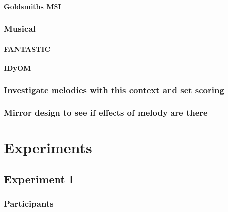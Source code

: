 \documentclass[]{book}
\let\oldparagraph\paragraph
\renewcommand{\paragraph}[1]{\oldparagraph{#1}\mbox{}}
\theoremstyle{definition}
\theoremstyle{definition}
\theoremstyle{definition}
\theoremstyle{remark}
\begin{document}
\hypertarget{goldsmiths-msi}{%
\paragraph{Goldsmiths MSI}\label{goldsmiths-msi}}

\hypertarget{musical}{%
\subsubsection{Musical}\label{musical}}

\hypertarget{fantastic-1}{%
\paragraph{FANTASTIC}\label{fantastic-1}}

\hypertarget{idyom}{%
\paragraph{IDyOM}\label{idyom}}

\hypertarget{investigate-melodies-with-this-context-and-set-scoring}{%
\subsubsection{Investigate melodies with this context and set
scoring}\label{investigate-melodies-with-this-context-and-set-scoring}}

\hypertarget{mirror-design-to-see-if-effects-of-melody-are-there}{%
\subsubsection{Mirror design to see if effects of melody are
there}\label{mirror-design-to-see-if-effects-of-melody-are-there}}

\hypertarget{experiments-1}{%
\section{Experiments}\label{experiments-1}}

\hypertarget{experiment-i}{%
\subsection{Experiment I}\label{experiment-i}}

\hypertarget{participants-1}{%
\subsubsection{Participants}\label{participants-1}}
\end{document}
